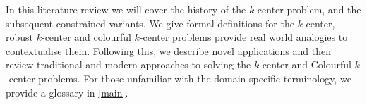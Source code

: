 In this literature review we will cover the history of the $k$-center problem, and the subsequent constrained variants. We give formal definitions for the $k$-center, robust $k$-center and colourful $k$-center problems provide real world analogies to contextualise them. Following this, we describe novel applications and then review traditional and modern approaches to solving the $k$-center and Colourful $k$-center problems. For those unfamiliar with the domain specific terminology, we provide a glossary in \cref{main}.